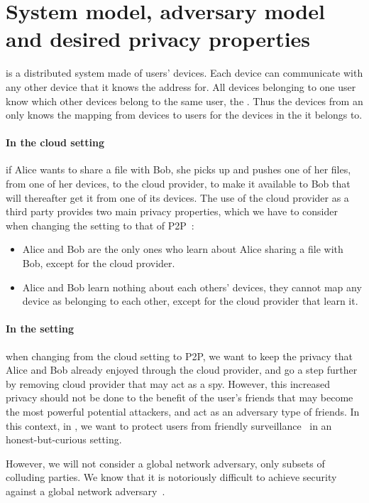 \section{System model, adversary model and desired privacy properties}%
\label{system-model}

\name is a distributed system made of users' devices. 
Each device can communicate with any other device that it knows the
address for. All devices belonging to one user
 know which other devices belong to the same user, \ie the \squad.
Thus the devices from an \squad only knows the mapping from devices to users for the devices in 
the \squad it belongs to.

\paragraph*{In the cloud setting} if Alice wants to share a file with
Bob, she picks up and pushes one of her files, from one of her devices, to the cloud
provider, to make it available to Bob that will thereafter get it from
one of its devices. The use of the cloud provider as a third party
provides two main privacy properties, which we have to consider when
changing the setting to that of \ac{P2P}~\cite{DevilInMetadata}:
\begin{itemize}
\item Alice and Bob are the only ones who learn 
about Alice sharing a file with Bob, except for the cloud provider.
\item Alice and Bob learn nothing about each others' devices, \ie 
they cannot map any device as belonging to each other, except for the
cloud provider that learn it.
\end{itemize} 

\paragraph*{In the \name setting} when changing from the cloud setting
to \ac{P2P}, we want to keep the privacy that Alice and Bob already
enjoyed through the cloud provider, and go a step further by removing 
cloud provider that may act as a spy. However, this increased privacy
should not be done to the benefit of the user's friends that may
become the most powerful potential attackers, and act
as an adversary type of friends.
In this context, in \name, we want to protect users from friendly
surveillance~\cite{FriendlySurveillance} in an honest-but-curious setting.

However, we will not consider a global network adversary, only subsets of colluding 
parties. We know that it is notoriously difficult to achieve security against a global 
network adversary~\cite{SystemsForAnonymousCommunication}.
